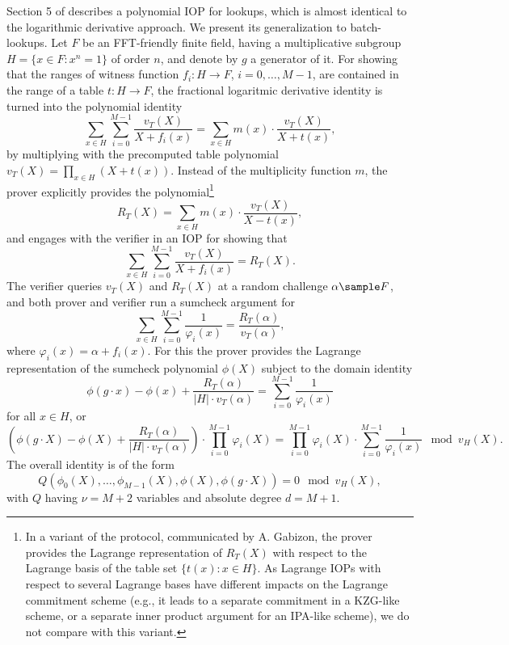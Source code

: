 \documentclass[11pt]{article}
\theoremstyle{definition}
\theoremstyle{definition}
\begin{document}
Section 5 of \cite{flookup} describes a polynomial IOP for lookups, which is almost identical to the logarithmic derivative approach. 
We present its generalization to batch-lookups. 
Let $F$ be an FFT-friendly finite field, having a multiplicative subgroup $H = \{x\in F: x^n = 1\}$ of order $n$, and denote by $g$ a generator of it.  
For showing that the ranges of witness function $f_i: H\rightarrow F$, $i=0, \ldots, M-1$, are contained in the range of a table $t: H\rightarrow F$, the fractional logaritmic derivative identity
is turned into the polynomial identity
\[
\sum_{x\in H} \sum_{i=0}^{M-1} \frac{v_T(X)}{X + f_i(x)} = \sum_{x\in H} m(x) \cdot \frac{v_T(X)}{X + t(x)},
\]
by multiplying with the precomputed table polynomial $v_T(X) = \prod_{x\in H} (X + t(x))$. 
Instead of the multiplicity function $m$, the prover explicitly provides the polynomial\footnote{%
In a variant of the protocol, communicated by A. Gabizon, the prover provides the Lagrange representation of $R_T(X)$ with respect to the Lagrange basis of the table set $\{t(x) : x\in H\}$. 
As Lagrange IOPs with respect to several Lagrange bases have different impacts on the Lagrange commitment scheme (e.g., it leads to a separate commitment in a KZG-like scheme, or a separate inner product argument for an IPA-like scheme), we do not compare with this variant.
}%
\[
R_T(X) = \sum_{x\in H} m(x) \cdot \frac{v_T(X)}{X - t(x)},
\]
and engages with the verifier in an IOP for showing that
\begin{equation}
\sum_{x\in H}  \sum_{i=0}^{M-1} \frac{v_T(X)}{X + f_i(x)} = R_T(X).
\end{equation}
The verifier queries $v_T(X)$ and $R_T(X)$ at a random challenge $\alpha\sample F$, and both prover and verifier run a sumcheck argument for 
\[
\sum_{x\in H}  \sum_{i=0}^{M-1} \frac{1}{\varphi_i(x)} = \frac{R_T(\alpha)}{v_T(\alpha)},
\]
where $\varphi_i(x) = \alpha + f_i(x)$.
For this the prover provides the Lagrange representation of the sumcheck polynomial $\phi(X)$  subject to the domain identity
\[
\phi(g\cdot x) - \phi(x) + \frac{R_T(\alpha)}{|H|\cdot v_T(\alpha)} = \sum_{i=0}^{M-1} \frac{1}{\varphi_i(x)}
\]
for all $x\in H$, or 
\begin{equation}
\label{e:flookup:overall:identity}
\left(\phi(g\cdot X) - \phi(X) + \frac{R_T(\alpha)}{|H|\cdot v_T(\alpha)}\right) \cdot \prod_{i=0}^{M-1} \varphi_i(X) =  \prod_{i=0}^{M-1} \varphi_i(X)\cdot  \sum_{i=0}^{M-1} \frac{1}{\varphi_i(x)}  \mod v_H(X).
\end{equation}
The overall identity is of the form 
\[
Q(\phi_0(X), \ldots, \phi_{M-1}(X), \phi(X), \phi(g\cdot X)) = 0 \mod v_H(X),
\]
with $Q$ having $\nu = M + 2$ variables and absolute degree $d = M + 1$.
\end{document}
